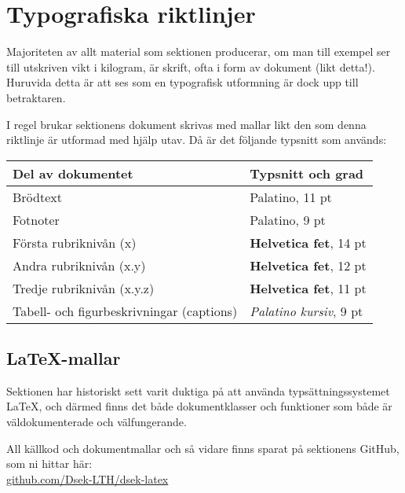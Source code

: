 \documentclass[]{dsekkallelse}
\begin{document}
\section{Typografiska riktlinjer}
Majoriteten av allt material som sektionen producerar, om man till exempel ser till utskriven vikt i kilogram, är skrift, ofta i form av dokument (likt detta!). Huruvida detta är att ses som en typografisk utformning är dock upp till betraktaren.

I regel brukar sektionens dokument skrivas med mallar likt den som denna riktlinje är utformad med hjälp utav. Då är det följande typsnitt som används:

\begin{table}[!hbp]
    \centering
    \begin{tabular}{ll}
        \toprule
        \textbf{Del av dokumentet}                & \textbf{Typsnitt och grad}                 \\
        \midrule
        Brödtext                                  & Palatino, 11 pt                            \\
        Fotnoter                                  & Palatino, 9 pt                             \\
        Första rubriknivån (x)                    & {\sffamily \bfseries Helvetica fet}, 14 pt \\
        Andra rubriknivån (x.y)                   & {\sffamily \bfseries Helvetica fet}, 12 pt \\
        Tredje rubriknivån (x.y.z)                & {\sffamily \bfseries Helvetica fet}, 11 pt \\
        Tabell- och figurbeskrivningar (captions) & \textit{Palatino kursiv}, 9 pt             \\

        \bottomrule
    \end{tabular}
    \label{tab:my_label}
\end{table}

\subsection{\LaTeX-mallar}
Sektionen har historiskt sett varit duktiga på att använda typsättningssystemet \LaTeX, och därmed finns det både dokumentklasser och funktioner som både är väldokumenterade och välfungerande.

All källkod och dokumentmallar och så vidare finns sparat på sektionens GitHub, som ni hittar här: \\
\href{https://github.com/Dsek-LTH/dsek-latex}{github.com/Dsek-LTH/dsek-latex}
\end{document}
